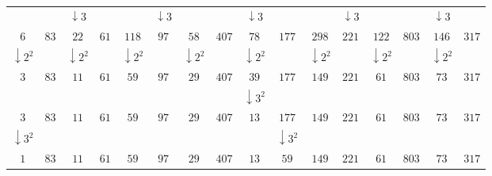 \documentclass[12pt]{article}
\begin{document}
\begin{table}[!ht]
\begin{tabular}{|cccccccccccccccc|}
                         &      & $\downarrow 3$   &                &                  & $\downarrow 3$ &                  &                 & $\downarrow 3$   &                  &                  & $\downarrow 3$ &                  &                 & $\downarrow 3$   &                \\
        $6$              & $83$ & $22$             & $61$           & $118$            & $97$           & $58$             & $407$           & $78$             & $177$            & $298$            & $221$          & $122$            & $803$           & $146$            & $317$          \\
        $\downarrow 2^2$ &      & $\downarrow 2^2$ &                & $\downarrow 2^2$ &                & $\downarrow 2^2$ &                 & $\downarrow 2^2$ &                  & $\downarrow 2^2$ &                & $\downarrow 2^2$ &                 & $\downarrow 2^2$ &                \\
        $3$              & $83$ & $11$             & $61$           & $59$             & $97$           & $29$             & $407$           & $39$             & $177$            & $149$            & $221$          & $61$             & $803$           & $73$             & $317$          \\
                         &      &                  &                &                  &                &                  &                 & $\downarrow 3^2$ &                  &                  &                &                  &                 &                  &                \\
        $3$              & $83$ & $11$             & $61$           & $59$             & $97$           & $29$             & $407$           & $13$             & $177$            & $149$            & $221$          & $61$             & $803$           & $73$             & $317$          \\
        $\downarrow 3^2$ &      &                  &                &                  &                &                  &                 &                  & $\downarrow 3^2$ &                  &                &                  &                 &                  &                \\
        $1$              & $83$ & $11$             & $61$           & $59$             & $97$           & $29$             & $407$           & $13$             & $59$             & $149$            & $221$          & $61$             & $803$           & $73$             & $317$          \\

\end{tabular}
\end{table}
\end{document}
